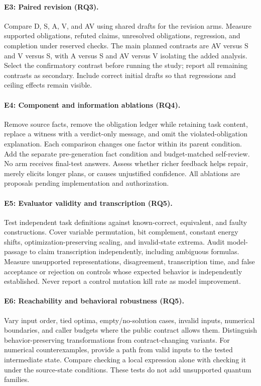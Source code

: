 \paragraph{E3: Paired revision (RQ3).}
Compare D, S, A, V, and AV using shared drafts for the revision arms. Measure
supported obligations, refuted claims, unresolved obligations, regression, and
completion under reserved checks. The main planned contrasts are AV versus S
and V versus S, with A versus S and AV versus V isolating the added analysis.
Select the confirmatory contrast before running the study; report all remaining
contrasts as secondary. Include correct initial drafts so that regressions and
ceiling effects remain visible.

\paragraph{E4: Component and information ablations (RQ4).}
Remove source facts, remove the obligation ledger while retaining task content,
replace a witness with a verdict-only message, and omit the violated-obligation
explanation. Each comparison changes one factor within its parent condition.
Add the separate pre-generation fact condition and budget-matched self-review.
No arm receives final-test answers. Assess whether richer feedback helps repair,
merely elicits longer plans, or causes unjustified confidence. All ablations are
proposals pending implementation and authorization.

\paragraph{E5: Evaluator validity and transcription (RQ5).}
Test independent task definitions against known-correct, equivalent, and faulty
constructions. Cover variable permutation, bit complement, constant energy shifts,
optimization-preserving scaling, and invalid-state extrema. Audit model-passage
to claim transcription independently, including ambiguous formulas. Measure
unsupported representations, disagreement, transcription time, and false acceptance
or rejection on controls whose expected behavior is independently established.
Never report a control mutation kill rate as model improvement.

\paragraph{E6: Reachability and behavioral robustness (RQ5).}
Vary input order, tied optima, empty/no-solution cases, invalid inputs, numerical
boundaries, and caller budgets where the public contract allows them. Distinguish
behavior-preserving transformations from contract-changing variants. For numerical
counterexamples, provide a path from valid inputs to the tested intermediate
state. Compare checking a local expression alone with checking it under the
source-state conditions. These tests do not add unsupported quantum families.

